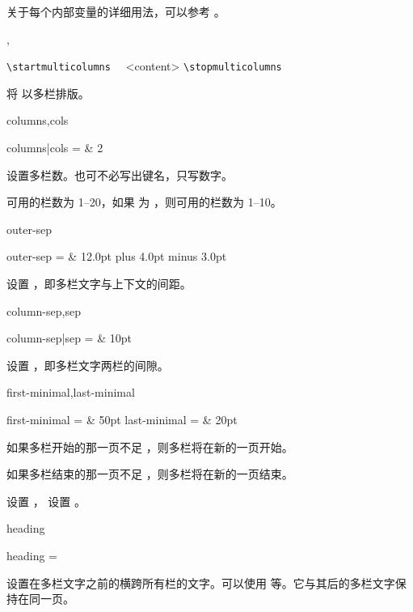 \documentclass{whudoc}
\begin{document}
关于每个内部变量的详细用法，可以参考 。

\begin{function}{\startmulticolumns,\stopmulticolumns}
  \begin{syntax}
    \verb|\startmulticolumns| 
    ~~<content>
    \verb|\stopmulticolumns|
  \end{syntax}
将  以多栏排版。
\end{function}

\begin{keyval}[path=multicolumns]{columns,cols}
  \begin{syntax}
    columns|cols =  & 2
  \end{syntax}
设置多栏数。也可不必写出键名，只写数字。

可用的栏数为 1--20，如果  为
，则可用的栏数为 1--10。
\end{keyval}

\begin{keyval}[path=multicolumns]{outer-sep}
  \begin{syntax}
    outer-sep =  & 12.0pt plus 4.0pt minus 3.0pt
  \end{syntax}
设置 ，即多栏文字与上下文的间距。
\end{keyval}

\begin{keyval}[path=multicolumns]{column-sep,sep}
  \begin{syntax}
    column-sep|sep =  & 10pt 
  \end{syntax}
设置 ，即多栏文字两栏的间隙。
\end{keyval}

\begin{keyval}[path=multicolumns]{first-minimal,last-minimal}
  \begin{syntax}
    first-minimal =  & 50pt 
    last-minimal  =  & 20pt 
  \end{syntax}
如果多栏开始的那一页不足 ，则多栏将在新的一页开始。

如果多栏结束的那一页不足 ，则多栏将在新的一页结束。

 设置 ，
 设置 。
\end{keyval}

\begin{keyval}[path=multicolumns]{heading}
  \begin{syntax}
    heading = 
  \end{syntax}
设置在多栏文字之前的横跨所有栏的文字。可以使用  等。它与其后的多栏文字保持在同一页。
\end{keyval}
\end{document}
